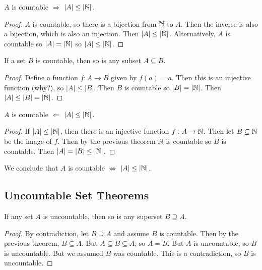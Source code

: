 \documentclass[main.tex]{subfiles}
\begin{document}
\begin{thm}
	\(A\) is countable \(\Rightarrow\) \(|A| \leq |\mathbb{N}|\).
\end{thm}

\begin{proof}
	\(A\) is countable, so there is a bijection from \(\mathbb{N}\) to \(A\). Then the inverse is also a bijection, which is also an injection. Then \(|A| \leq |\mathbb{N}|\). Alternatively, \(A\) is countable so \(|A| = |\mathbb{N}|\) so \(|A| \leq |\mathbb{N}|\).
\end{proof}

\begin{thm}
	If a set \(B\) is countable, then so is any subset \(A \subseteq B\).
\end{thm}

\begin{proof}
	Define a function \(f : A \rightarrow B\) given by \(f(a) = a\). Then this is an injective function (why?), so \(|A| \leq |B|\). Then \(B\) is countable so \(|B| = |\mathbb{N}|\). Then \(|A| \leq |B| = |\mathbb{N}|\).
\end{proof}

\begin{thm}
	\(A\) is countable \(\Leftarrow\) \(|A| \leq |\mathbb{N}|\).
\end{thm}

\begin{proof}
	If \(|A| \leq |\mathbb{N}|\), then there is an injective function \(f : A \rightarrow \mathbb{N}\). Then let \(B \subseteq \mathbb{N}\) be the image of \(f\). Then by the previous theorem \(\mathbb{N}\) is countable so \(B\) is countable. Then \(|A| = |B| \leq |\mathbb{N}|\).
\end{proof}

\begin{rem}
	We conclude that \(A\) is countable \(\Leftrightarrow\) \(|A| \leq |\mathbb{N}|\).
\end{rem}

\subsection{Uncountable Set Theorems}

\begin{thm}
	If any set \(A\) is uncountable, then so is any superset \(B \supseteq A\).
\end{thm}

\begin{proof}
	By contradiction, let \(B \supseteq A\) and assume \(B\) is countable. Then by the previous theorem, \(B \subseteq A\). But \(A \subseteq B \subseteq A\), so \(A = B\). But \(A\) is uncountable, so \(B\) is uncountable. But we assumed \(B\) was countable. This is a contradiction, so \(B\) is uncountable.
\end{proof}
\end{document}
